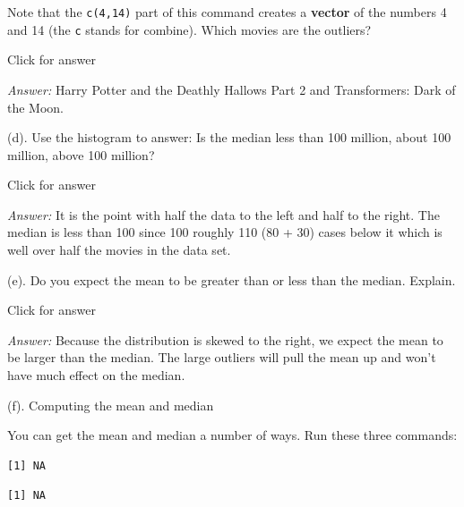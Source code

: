 \documentclass[
]{book}
\newenvironment{Shaded}{\begin{snugshade}}{\end{snugshade}}
\newcommand{\FunctionTok}[1]{\textcolor[rgb]{0.00,0.00,0.00}{#1}}
\newcommand{\NormalTok}[1]{#1}
\newcommand{\SpecialCharTok}[1]{\textcolor[rgb]{0.00,0.00,0.00}{#1}}
\begin{document}
Note that the \texttt{c(4,14)} part of this command creates a \textbf{vector} of the numbers 4 and 14 (the \texttt{c} stands for combine). Which movies are the outliers?

Click for answer

\emph{Answer:} Harry Potter and the Deathly Hallows Part 2 and Transformers: Dark of the Moon.

(d). Use the histogram to answer: Is the median less than 100 million, about 100 million, above 100 million?

Click for answer

\emph{Answer:} It is the point with half the data to the left and half to the right. The median is less than 100
since 100 roughly 110 (80 + 30) cases below it which is well over half the movies in the data set.

(e). Do you expect the mean to be greater than or less than the median. Explain.

Click for answer

\emph{Answer:} Because the distribution is skewed to the right, we expect the mean to be larger than the median.
The large outliers will pull the mean up and won't have much effect on the median.

(f). Computing the mean and median

You can get the mean and median a number of ways. Run these three commands:

\begin{Shaded}
\end{Shaded}

\begin{verbatim}
[1] NA
\end{verbatim}

\begin{Shaded}
\end{Shaded}

\begin{verbatim}
[1] NA
\end{verbatim}

\begin{Shaded}
\end{Shaded}
\end{document}
